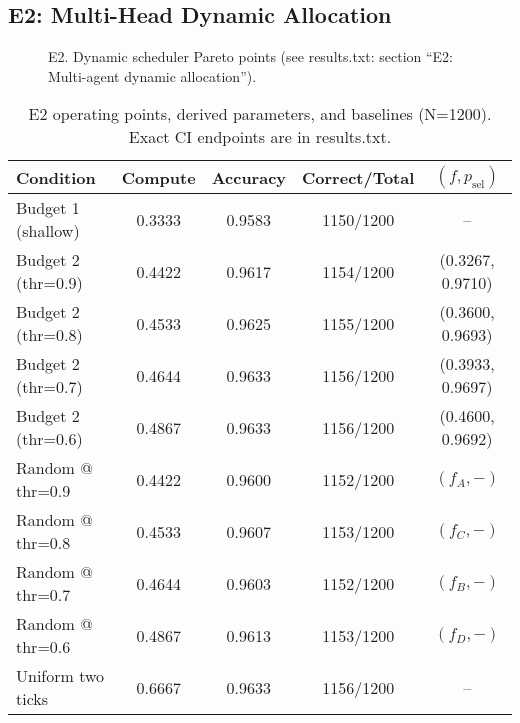 \subsection{E2: Multi-Head Dynamic Allocation}
\begin{figure}[H]
  \centering
  \begin{adjustbox}{width=\linewidth}
  \end{adjustbox}
  \caption{E2. Dynamic scheduler Pareto points (see results.txt: section ``E2: Multi-agent dynamic allocation'').}
  \label{fig:e2}
\end{figure}

\begin{table}[H]
  \centering
  \caption{E2 operating points, derived parameters, and baselines (N=1200). Exact CI endpoints are in results.txt.}
  \vspace{0.25em}
  \begin{adjustbox}{width=\linewidth}
  \begin{tabular}{l c c c c}
    \toprule
    Condition & Compute & Accuracy & Correct/Total & $(f, p_{\mathrm{sel}})$ \\
    \midrule
    Budget 1 (shallow) & 0.3333 & 0.9583 & 1150/1200 & -- \\
    Budget 2 (thr=0.9) & 0.4422 & 0.9617 & 1154/1200 & (0.3267, 0.9710) \\
    Budget 2 (thr=0.8) & 0.4533 & 0.9625 & 1155/1200 & (0.3600, 0.9693) \\
    Budget 2 (thr=0.7) & 0.4644 & 0.9633 & 1156/1200 & (0.3933, 0.9697) \\
    Budget 2 (thr=0.6) & 0.4867 & 0.9633 & 1156/1200 & (0.4600, 0.9692) \\
    \midrule
    Random @ thr=0.9 & 0.4422 & 0.9600 & 1152/1200 & $(f_A, -)$ \\
    Random @ thr=0.8 & 0.4533 & 0.9607 & 1153/1200 & $(f_C, -)$ \\
    Random @ thr=0.7 & 0.4644 & 0.9603 & 1152/1200 & $(f_B, -)$ \\
    Random @ thr=0.6 & 0.4867 & 0.9613 & 1153/1200 & $(f_D, -)$ \\
    Uniform two ticks & 0.6667 & 0.9633 & 1156/1200 & -- \\
    \bottomrule
  \end{tabular}
  \end{adjustbox}
\end{table}

